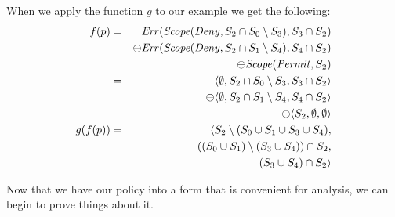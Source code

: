 When we apply the function $g$ to our example we get the following:
\begin{eqnarray*}
  f(p) & = & \text{\textit{Err}} (\text{\textit{Scope}} (\text{\textit{Deny}}, S_2 \cap S_0 \setminus S_3), S_3 \cap S_2) \\
  & & \ominus \text{\textit{Err}} (\text{\textit{Scope}} (\text{\textit{Deny}}, S_2 \cap S_1 \setminus S_4), S_4 \cap S_2) \\
  & & \ominus \text{\textit{Scope}} (\text{\textit{Permit}}, S_2)
  \\
  & = & \langle \emptyset, S_2 \cap S_0 \setminus S_3, S_3 \cap S_2 \rangle \\
  & & \ominus \langle \emptyset, S_2 \cap S_1 \setminus S_4, S_4 \cap S_2 \rangle \\
  & & \ominus \langle S_2, \emptyset, \emptyset \rangle
  \\
  g(f(p))  & = & \langle S_2 \setminus (S_0 \cup S_1 \cup S_3 \cup S_4), \\
  & & ((S_0 \cup S_1) \setminus (S_3 \cup S_4)) \cap S_2, \\
  & &  (S_3 \cup S_4) \cap S_2 \rangle
\end{eqnarray*}

Now that we have our policy into a form that is convenient for
analysis, we can begin to prove things about it.


